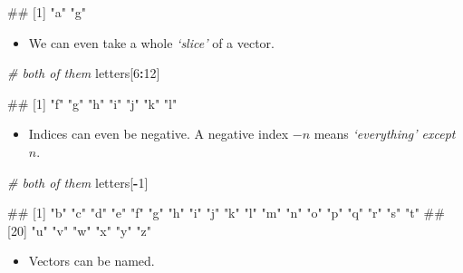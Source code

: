 \documentclass[
]{book}
\newenvironment{Shaded}{\begin{snugshade}}{\end{snugshade}}
\newcommand{\CommentTok}[1]{\textcolor[rgb]{0.56,0.35,0.01}{\textit{#1}}}
\newcommand{\DecValTok}[1]{\textcolor[rgb]{0.00,0.00,0.81}{#1}}
\newcommand{\NormalTok}[1]{#1}
\newcommand{\SpecialCharTok}[1]{\textcolor[rgb]{0.81,0.36,0.00}{\textbf{#1}}}
\providecommand{\tightlist}{%
  \setlength{\itemsep}{0pt}\setlength{\parskip}{0pt}}
\begin{document}
\begin{Shaded}
\begin{Highlighting}[]
\NormalTok{\#\# [1] "a" "g"}
\end{Highlighting}
\end{Shaded}

\begin{itemize}
\tightlist
\item
  We can even take a whole \emph{`slice'} of a vector.
\end{itemize}

\begin{Shaded}
\begin{Highlighting}[]
\CommentTok{\# both of them}
\NormalTok{letters[}\DecValTok{6}\SpecialCharTok{:}\DecValTok{12}\NormalTok{]}
\end{Highlighting}
\end{Shaded}

\begin{Shaded}
\begin{Highlighting}[]
\NormalTok{\#\# [1] "f" "g" "h" "i" "j" "k" "l"}
\end{Highlighting}
\end{Shaded}

\begin{itemize}
\tightlist
\item
  Indices can even be negative. A negative index \(-n\) means \emph{`everything' except \(n\)}.
\end{itemize}

\begin{Shaded}
\begin{Highlighting}[]
\CommentTok{\# both of them}
\NormalTok{letters[}\SpecialCharTok{{-}}\DecValTok{1}\NormalTok{]}
\end{Highlighting}
\end{Shaded}

\begin{Shaded}
\begin{Highlighting}[]
\NormalTok{\#\#  [1] "b" "c" "d" "e" "f" "g" "h" "i" "j" "k" "l" "m" "n" "o" "p" "q" "r" "s" "t"}
\NormalTok{\#\# [20] "u" "v" "w" "x" "y" "z"}
\end{Highlighting}
\end{Shaded}

\begin{itemize}
\tightlist
\item
  Vectors can be named.
\end{itemize}
\end{document}
